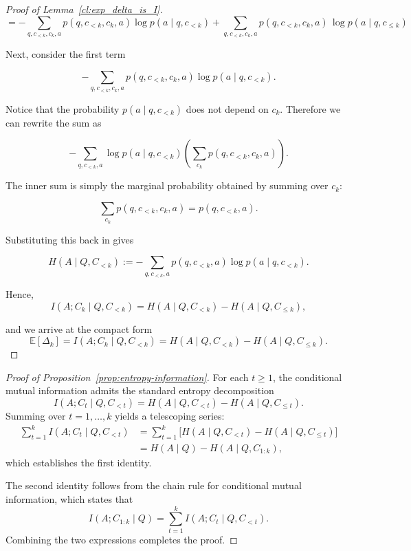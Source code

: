 \documentclass{article}
\begin{document}
\begin{proof}[Proof of Lemma~\ref{cl:exp_delta_is_I}]
\begin{equation*}
= - \sum_{q,c_{<k},c_k,a}
p(q,c_{<k},c_k,a)\log p(a \mid q,c_{<k}) +\sum_{q,c_{<k},c_k,a}
p(q,c_{<k},c_k,a)\,\log p(a\mid q,c_{\le k}) 
\end{equation*}

Next, consider the first term

\begin{equation*}
-\sum_{q,c_{<k},c_k,a} p(q,c_{<k},c_k,a) \log p(a \mid q,c_{<k}).
\end{equation*}

Notice that the probability $p(a \mid q,c_{<k})$ does not depend on $c_k$. Therefore we can rewrite the sum as

\begin{equation*}
-\sum_{q,c_{<k},a} \log p(a \mid q,c_{<k}) \left( \sum_{c_k} p(q,c_{<k},c_k,a) \right).
\end{equation*}

The inner sum is simply the marginal probability obtained by summing over $c_k$:

\begin{equation*}
\sum_{c_k} p(q,c_{<k},c_k,a) = p(q,c_{<k},a).
\end{equation*}

Substituting this back in gives

\begin{equation*}
H(A \mid Q, C_{<k}):=-\sum_{q,c_{<k},a} p(q,c_{<k},a) \log p(a \mid q,c_{<k}).
\end{equation*}

Hence, 
\begin{equation*}
I(A;C_k \mid Q,C_{<k}) = H(A \mid Q,C_{<k}) - H(A \mid Q,C_{\le k}),
\end{equation*}

and we arrive at the compact form
\begin{equation*}
\mathbb{E}[\Delta_k] = I(A;C_k \mid Q,C_{<k}) = H(A\mid Q,C_{<k}) - H(A\mid Q,C_{\le k}).
\end{equation*}
\end{proof}

\begin{proof}[Proof of Proposition~\ref{prop:entropy-information}]
For each $t \ge 1$, the conditional mutual information admits the standard entropy decomposition
\[
I(A; C_t \mid Q, C_{<t})
=
H(A \mid Q, C_{<t}) - H(A \mid Q, C_{\le t}).
\]
Summing over $t = 1,\dots,k$ yields a telescoping series:
\begin{align*}
\sum_{t=1}^k I(A; C_t \mid Q, C_{<t})
&=
\sum_{t=1}^k \bigl[ H(A \mid Q, C_{<t}) - H(A \mid Q, C_{\le t}) \bigr] \\
&=
H(A \mid Q) - H(A \mid Q, C_{1:k}),
\end{align*}
which establishes the first identity.

The second identity follows from the chain rule for conditional mutual information, which states that
\[
I(A; C_{1:k} \mid Q)
=
\sum_{t=1}^k I(A; C_t \mid Q, C_{<t}).
\]
Combining the two expressions completes the proof.
\end{proof}
\end{document}
